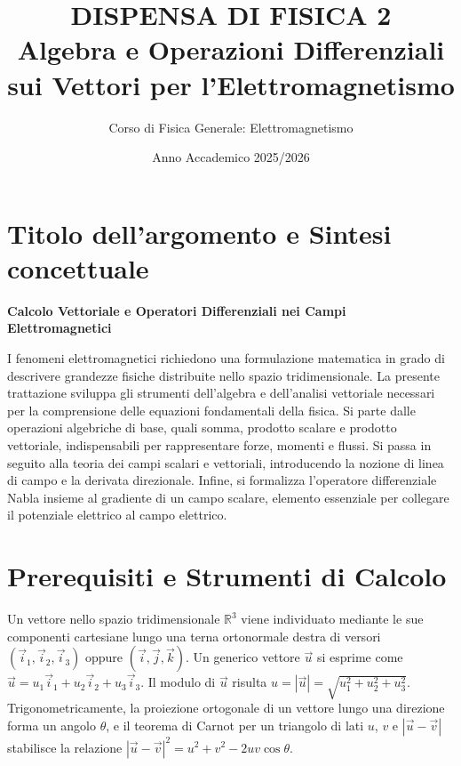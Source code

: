 \documentclass[12pt, a4paper]{article}
\title{\textbf{DISPENSA DI FISICA 2}\\ \Large Algebra e Operazioni Differenziali sui Vettori per l'Elettromagnetismo}
\author{Corso di Fisica Generale: Elettromagnetismo}
\date{Anno Accademico 2025/2026}
\begin{document}
	
	\maketitle
	
	\section{Titolo dell'argomento e Sintesi concettuale}
	
	\textbf{Calcolo Vettoriale e Operatori Differenziali nei Campi Elettromagnetici}
	
	I fenomeni elettromagnetici richiedono una formulazione matematica in grado di descrivere grandezze fisiche distribuite nello spazio tridimensionale. La presente trattazione sviluppa gli strumenti dell'algebra e dell'analisi vettoriale necessari per la comprensione delle equazioni fondamentali della fisica. Si parte dalle operazioni algebriche di base, quali somma, prodotto scalare e prodotto vettoriale, indispensabili per rappresentare forze, momenti e flussi. Si passa in seguito alla teoria dei campi scalari e vettoriali, introducendo la nozione di linea di campo e la derivata direzionale. Infine, si formalizza l'operatore differenziale Nabla insieme al gradiente di un campo scalare, elemento essenziale per collegare il potenziale elettrico al campo elettrico.
	
	\section{Prerequisiti e Strumenti di Calcolo}
	
	\begin{tcolorbox}[title=BOX 1: Richiamo Matematico -- Vettori, Componenti e Trigonometria]
		Un vettore nello spazio tridimensionale $\mathbb{R}^3$ viene individuato mediante le sue componenti cartesiane lungo una terna ortonormale destra di versori $(\vec{i}_1, \vec{i}_2, \vec{i}_3)$ oppure $(\vec{i}, \vec{j}, \vec{k})$. Un generico vettore $\vec{u}$ si esprime come $\vec{u} = u_1 \vec{i}_1 + u_2 \vec{i}_2 + u_3 \vec{i}_3$. Il modulo di $\vec{u}$ risulta $u = |\vec{u}| = \sqrt{u_1^2 + u_2^2 + u_3^2}$. Trigonometricamente, la proiezione ortogonale di un vettore lungo una direzione forma un angolo $\theta$, e il teorema di Carnot per un triangolo di lati $u$, $v$ e $|\vec{u}-\vec{v}|$ stabilisce la relazione $|\vec{u}-\vec{v}|^2 = u^2 + v^2 - 2uv \cos\theta$.
	\end{tcolorbox}
	
\end{document}
